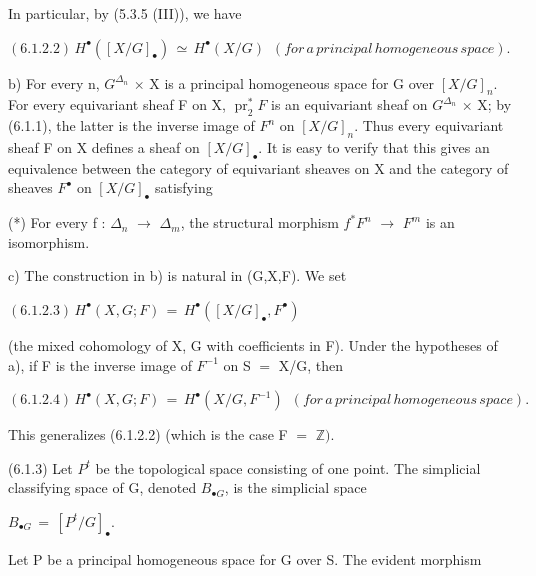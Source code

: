 \documentclass[11pt,twoside]{article}
\newcommand{\DFormula}[1]{%
  \par\smallskip\noindent\hspace*{0pt}\(\displaystyle #1\)\par\smallskip
}
\begin{document}
In particular, by (5.3.5 (III)), we have\par
\par\medskip
\DFormula{(6.1.2.2)\,H^{\bullet }([X/G]_{\bullet })\,\simeq \,H^{\bullet }(X/G)\,\,\,(for\,a\,principal\,homogeneous\,space).}
\par\medskip
b) For every n, \(G^{\Delta _{n}}\) \(\times \) X is a principal homogeneous space for G over \([X/G]_{n}\). For every equivariant sheaf F on X, \(\operatorname{pr}_{2}^{\ast }F\) is an equivariant sheaf on \(G^{\Delta _{n}}\) \(\times \) X; by (6.1.1), the latter is the inverse image of \(F^{n}\) on \([X/G]_{n}\). Thus every equivariant sheaf F on X defines a sheaf on \([X/G]_{\bullet }\). It is easy to verify that this gives an equivalence between the category of equivariant sheaves on X and the category of sheaves \(F^{\bullet }\) on \([X/G]_{\bullet }\) satisfying\par
\par\medskip
(*) For every f : \(\Delta _{n}\) \(\to \) \(\Delta _{m}\), the structural morphism \(f^{\ast }F^{n}\) \(\to \) \(F^{m}\) is an isomorphism.\par
\par\medskip
c) The construction in b) is natural in (G,X,F). We set\par
\par\medskip
\DFormula{(6.1.2.3)\,H^{\bullet }(X,G;F)\,=\,H^{\bullet }([X/G]_{\bullet },F^{\bullet })}
\par\medskip
(the mixed cohomology of X, G with coefficients in F). Under the hypotheses of a), if F is the inverse image of \(F^{−1}\) on S \(=\) X/G, then\par
\par\medskip
\DFormula{(6.1.2.4)\,H^{\bullet }(X,G;F)\,=\,H^{\bullet }(X/G,F^{−1})\,\,\,(for\,a\,principal\,homogeneous\,space).}
\par\medskip
This generalizes (6.1.2.2) (which is the case F \(=\) \(\mathbb{Z})\).\par
\par\medskip
(6.1.3) Let \(P^{t}\) be the topological space consisting of one point. The simplicial classifying space of G, denoted \(B_{\bullet G}\), is the simplicial space\par
\par\medskip
\DFormula{B_{\bullet G}\,=\,[P^{t}/G]_{\bullet }.}
\par\medskip
Let P be a principal homogeneous space for G over S. The evident morphism\par
\par\medskip
\end{document}
